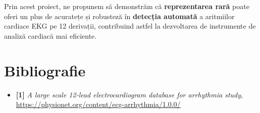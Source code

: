\documentclass[12pt]{article}
\begin{document}
Prin acest proiect, ne propunem să demonstrăm că \textbf{reprezentarea rară} poate oferi un plus de acuratețe și robusteză în \textbf{detecția automată} a aritmiilor cardiace EKG pe 12 derivații, contribuind astfel la dezvoltarea de instrumente de analiză cardiacă mai eficiente.

\section*{Bibliografie}
\begin{itemize}
    \item \textbf{[1]} \emph{A large scale 12-lead electrocardiogram database for arrhythmia study}, \url{https://physionet.org/content/ecg-arrhythmia/1.0.0/}
\end{itemize}
\end{document}
